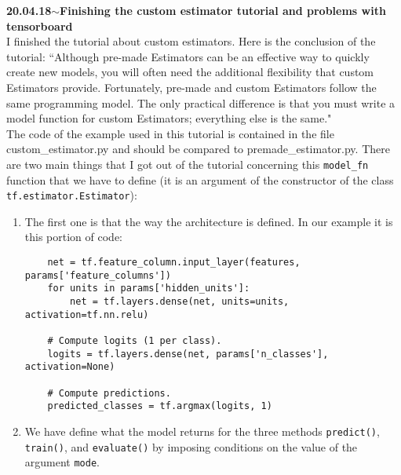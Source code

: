\documentclass[11pt,a4paper]{article}
\newenvironment{loggentry}[2]%
{\noindent\textbf{#1}\hspace{1cm}$\mathbf{\sim}$\text{ }\textbf{#2}\\}{\vspace{0.5cm}}
\begin{document}
\begin{loggentry}{20.04.18}{Finishing the custom estimator tutorial and problems with tensorboard}
I finished the tutorial about custom estimators. Here is the conclusion of the tutorial: ``Although pre-made Estimators can be an effective way to quickly create new models, you will often need the additional flexibility that custom Estimators provide. Fortunately, pre-made and custom Estimators follow the same programming model. The only practical difference is that you must write a model function for custom Estimators; everything else is the same."\\
The code of the example used in this tutorial is contained in the file custom\_estimator.py and should be compared to premade\_estimator.py. There are two main things that I got out of the tutorial concerning this \texttt{model\_fn} function that we have to define (it is an argument of the constructor of the class \texttt{tf.estimator.Estimator}):\\
\begin{enumerate}
\item The first one is that the way the architecture is defined. In our example it is this portion of code:\\
\begin{verbatim}
    net = tf.feature_column.input_layer(features, params['feature_columns'])
    for units in params['hidden_units']:
        net = tf.layers.dense(net, units=units, activation=tf.nn.relu)

    # Compute logits (1 per class).
    logits = tf.layers.dense(net, params['n_classes'], activation=None)

    # Compute predictions.
    predicted_classes = tf.argmax(logits, 1)
\end{verbatim}
\item We have define what the model returns for the three methods \texttt{predict()}, \texttt{train()}, and \texttt{evaluate()} by imposing conditions on the value of the argument \texttt{mode}.
\end{enumerate}


\end{loggentry}
\end{document}

